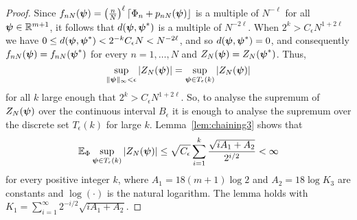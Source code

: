 \documentclass[aap]{imsart}
\newcommand{\reals}{{\mathbb R}}
\newcommand{\expect}{{\mathbb E}}
\newcommand{\abs}[1]{\left\vert #1 \right\vert}
\newcommand{\sabs}[1]{\vert #1 \vert}
\newcommand{\round}[1]{{\left\lceil #1 \right\rfloor}}
\begin{document}
\begin{proof}
Since $f_{nN}(\psibf) = \left( \tfrac{n}{N}\right)^\ell \round{\Phi_n + p_{nN}(\psibf)}$ is a multiple of $N^{-\ell}$ for all $\psibf \in \reals^{m+1}$, it follows that $d(\boldsymbol{\psi}, \boldsymbol{\psi}^*)$ is a multiple of $N^{-2\ell}$.  When $2^k > C_\epsilon N^{1+2\ell}$ we have $0 \leq d(\boldsymbol{\psi}, \boldsymbol{\psi}^*) < 2^{-k} C_\epsilon N < N^{-2\ell}$, and so $d(\boldsymbol{\psi}, \boldsymbol{\psi}^*) = 0$, and consequently $f_{nN}(\boldsymbol{\psi}) = f_{nN}(\boldsymbol{\psi}^*)$  for every $n = 1, \dots, N$ and $Z_N(\boldsymbol{\psi}) = Z_N(\boldsymbol{\psi}^*)$.  Thus,
\[
\sup_{\|\psibf\|_{\infty} < \epsilon } \abs{ Z_N(\psibf) } = \sup_{\psibf \in T_\epsilon(k) } \abs{ Z_N(\psibf) }
\]
for all $k$ large enough that $2^{k} > C_\epsilon N^{1+2\ell}$.  So, to analyse the supremum of $Z_N(\boldsymbol{\psi})$ over the continuous interval $B_\epsilon$ it is enough to analyse the supremum over the discrete set $T_\epsilon(k)$ for large $k$.  
Lemma~\ref{lem:chaining3} shows that 
\[
\expect_{\Phi} \sup_{\psibf \in T_\epsilon(k) } \abs{ Z_N(\psibf) } \leq \sqrt{C_\epsilon} \sum_{i=1}^{k}\frac{\sqrt{ i A_1 + A_2}}{2^{i/2}} < \infty
\]
for every positive integer $k$, where $A_1 = 18(m+1)\log 2$ and $A_2 = 18\log K_3$ are constants and $\log(\cdot)$ is the natural logarithm.  The lemma holds with $K_1 =  \sum_{i=1}^{\infty}2^{-i/2}\sqrt{ i A_1 + A_2 }$.
\end{proof}
\end{document}
